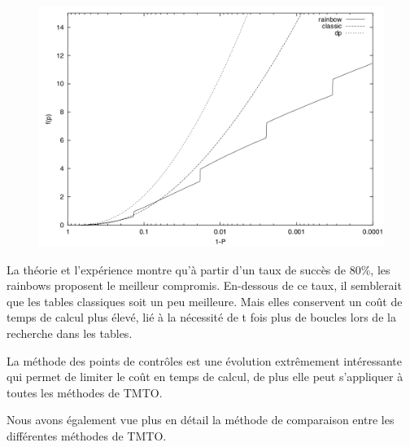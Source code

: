 \begin{figure}[h!]
	\includegraphics[scale=0.25]{other/graph_gamma_P.png}
	\label{fig:TMTO_carac}
\end{figure}

	La théorie et l'expérience montre qu'à partir d'un taux de succès de 80\%, les \glspl{rainbow} proposent le meilleur compromis. En-dessous de ce taux, il semblerait que les tables classiques soit un peu meilleure. Mais elles conservent un coût de temps de calcul plus élevé, lié à la nécessité de t fois plus de boucles lors de la recherche dans les tables.

	La méthode des points de contrôles est une évolution extrêmement intéressante qui permet de limiter le coût en temps de calcul, de plus elle peut s'appliquer à toutes les méthodes de \gls{TMTO}.

	\bigskip

	Nous avons également vue plus en détail la méthode de comparaison entre les différentes méthodes de \gls{TMTO}.

\endinput{}
